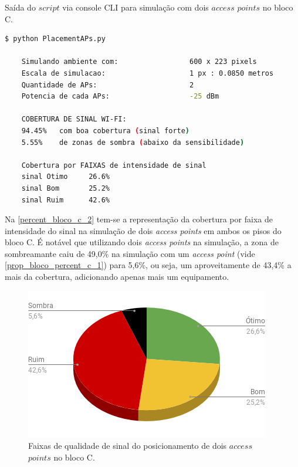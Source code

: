 \documentclass[
	12pt,				%
	twoside,			%
	a4paper,			%
	english,			%
	french,				%
	spanish,			%
	brazil				%
	]{abntex2}
\begin{document}
\begin{quadro}[!htb]
    \caption{\label{saida_bloco_c_2} Saída do $script$ via console CLI para simulação com dois $access$ $points$ no bloco C. }

    \begin{lstlisting}[language=bash]
    $ python PlacementAPs.py 

    Simulando ambiente com:                 600 x 223 pixels
    Escala de simulacao:                    1 px : 0.0850 metros
    Quantidade de APs:                      2
    Potencia de cada APs:                   -25 dBm

    COBERTURA DE SINAL WI-FI:
    94.45%   com boa cobertura (sinal forte)
    5.55%    de zonas de sombra (abaixo da sensibilidade)

    Cobertura por FAIXAS de intensidade de sinal
    sinal Otimo     26.6%
    sinal Bom       25.2%
    sinal Ruim      42.6%
    \end{lstlisting}

\end{quadro}

Na \autoref{percent_bloco_c_2} tem-se a representação da cobertura por
faixa de intensidade do sinal na simulação de dois \emph{access points}
em ambos os pisos do bloco C. É notável que utilizando dois \emph{access
points} na simulação, a zona de sombreamante caiu de 49,0\% na simulação
com um \emph{access point} (vide \autoref{prop_bloco_percent_c_1}) para
5,6\%, ou seja, um aproveitamente de 43,4\% a mais da cobertura,
adicionando apenas mais um equipamento.

\begin{figure}[ht]
    \caption{\label{percent_bloco_c_2} Faixas de qualidade de sinal do posicionamento de dois $access$ $points$ no bloco C.}
    \begin{center}
        \includegraphics[scale=0.4]{imagens/percent-bloco-c-2.png}
    \end{center}
\end{figure}
\end{document}
